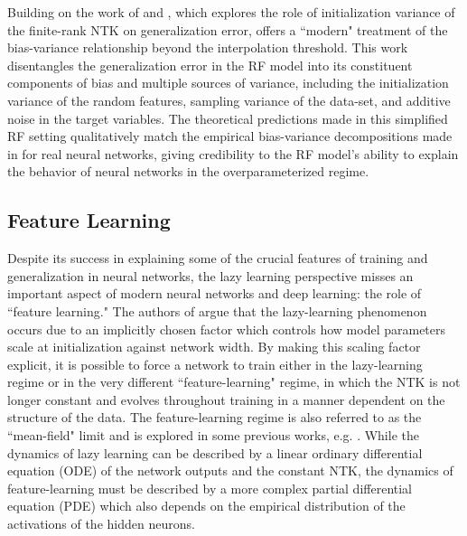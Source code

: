 \documentclass[a4paper, 12pt]{article}
\begin{document}
Building on the work of \cite{meiGeneralizationErrorRandom2019} and \cite{ geigerScalingDescriptionGeneralization2019}, which explores the role of initialization variance of the finite-rank NTK on generalization error, \cite{dascoliDoubleTroubleDouble2020} offers a ``modern" treatment of the bias-variance relationship beyond the interpolation threshold. This work disentangles the generalization error in the RF model into its constituent components of bias and multiple sources of variance, including the initialization variance of the random features, sampling variance of the data-set, and additive noise in the target variables. The theoretical predictions made in this simplified RF setting qualitatively match the empirical bias-variance decompositions made in \cite{nealModernTakeBiasVariance2019} for real neural networks, giving credibility to the RF model's ability to explain the behavior of neural networks in the overparameterized regime.

\subsection{Feature Learning}

Despite its success in explaining some of the crucial features of training and generalization in neural networks, the lazy learning perspective misses an important aspect of modern neural networks and deep learning: the role of ``feature learning."  The authors of \cite{chizatLazyTrainingDifferentiable2020} argue that the lazy-learning phenomenon occurs due to an implicitly chosen factor which controls how model parameters scale at initialization against network width. By making this scaling factor explicit, it is possible to force a network to train either in the lazy-learning regime or in the very different ``feature-learning" regime, in which the NTK is not longer constant and evolves throughout training in a manner dependent on the structure of the data. The feature-learning regime is also referred to as the ``mean-field" limit and is explored in some previous works, e.g. \cite{meiMeanFieldView2018}. While the dynamics of lazy learning can be described by a linear ordinary differential equation (ODE) of the network outputs and the constant NTK, the dynamics of feature-learning must be described by a more complex partial differential equation (PDE) which also depends on the empirical distribution of the activations of the hidden neurons.\\
\end{document}
